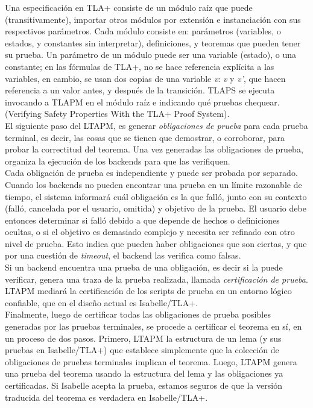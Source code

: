 \documentclass[spanish]{llncs}
\begin{document}
  Una especificación en TLA+ consiste de un módulo raíz que puede (transitivamente), importar otros módulos por extensión e instanciación con
  sus respectivos parámetros. Cada módulo consiste en: parámetros (variables, o estados, y constantes sin interpretar), definiciones,
  y teoremas que pueden tener su prueba. Un parámetro de un módulo puede ser una variable (estado), o una constante; en las fórmulas de TLA+, no se hace referencia explícita
  a las variables, en cambio, se usan dos copias de una variable \textit{v}: \textit{v} y \textit{v'}, que hacen referencia a un valor antes, y después de la transición. 
  TLAPS se ejecuta invocando a TLAPM en el módulo raíz e indicando qué pruebas chequear. (Verifying Safety Properties With the TLA+ Proof System).
  \\
  El siguiente paso del LTAPM, es generar \textit{obligaciones de prueba} para cada prueba terminal, es decir, las cosas que se tienen que demostrar, o corroborar, para
  probar la correctitud del teorema. Una vez generadas las obligaciones de prueba, organiza la ejecución de los backends para que las verifiquen.
  \\
  Cada obligación de prueba es independiente y puede ser probada por separado. Cuando los
  backends no pueden encontrar una prueba en un límite razonable de tiempo, el sistema
  informará cuál obligación es la que falló, junto con su contexto (falló, cancelada por el usuario, omitida) y objetivo de la prueba. El usuario debe
  entonces determinar si falló debido a que depende de hechos o definiciones ocultas, o si el objetivo es
  demasiado complejo y necesita ser refinado con otro nivel de prueba. Esto indica que pueden haber obligaciones que son ciertas, y que por una cuestión de \textit{timeout},
  el backend las verifica como falsas.
  \\
  Si un backend encuentra una prueba de una obligación, es decir si la puede verificar,
  genera una traza de la prueba realizada, llamada \textit{certificación de prueba}. LTAPM  mediará
  la certificación de los scripts de prueba en un entorno lógico confiable, que en el diseño actual
  es Isabelle/TLA+.
  \\
  Finalmente, luego de certificar todas las obligaciones de prueba posibles generadas por las pruebas
  terminales, se procede a certificar el teorema en sí, en un proceso de dos pasos. Primero, LTAPM  la
  estructura de un lema (y sus pruebas en Isabelle/TLA+) que establece simplemente que la colección de
  obligaciones de pruebas terminales implican el teorema. Luego, LTAPM genera una prueba del teorema
  usando la estructura del lema y las obligaciones ya certificadas. Si Isabelle acepta la prueba, estamos
  seguros de que la versión traducida del teorema es verdadera en Isabelle/TLA+.
\end{document}
